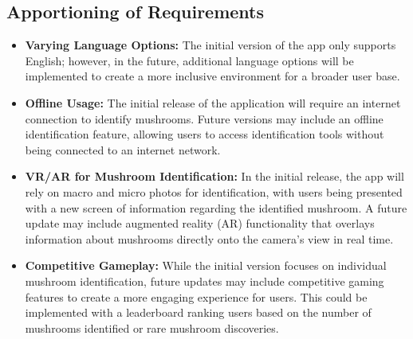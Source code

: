 \documentclass[]{article}
\begin{document}
\subsection{Apportioning of Requirements}
\label{sub:apportioning_of_requirements}
\begin{itemize}
	\item \textbf{Varying Language Options:} The initial version of the app only supports English; however, in the future, additional language options will be implemented to create a more inclusive environment for a broader user base.
	\item \textbf{Offline Usage:} The initial release of the application will require an internet connection to identify mushrooms. Future versions may include an offline identification feature, allowing users to access identification tools without being connected to an internet network.
	\item \textbf{VR/AR for Mushroom Identification:} In the initial release, the app will rely on macro and micro photos for identification, with users being presented with a new screen of information regarding the identified mushroom. A future update may include augmented reality (AR) functionality that overlays information about mushrooms directly onto the camera’s view in real time.
	\item \textbf{Competitive Gameplay:} While the initial version focuses on individual mushroom identification, future updates may include competitive gaming features to create a more engaging experience for users. This could be implemented with a leaderboard ranking users based on the number of mushrooms identified or rare mushroom discoveries.
\end{itemize}

\end{document}
